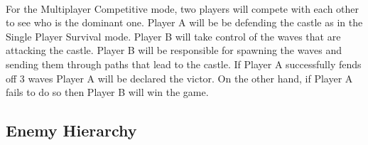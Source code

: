 \paragraph{} For the Multiplayer Competitive mode, two players will compete with each other to see who is the dominant one. Player A will be be defending the castle as in the Single Player Survival mode. Player B will take control of the waves that are attacking the castle. Player B will be responsible for spawning the waves and sending them through paths that lead to the castle. If Player A successfully fends off 3 waves Player A will be declared the victor. On the other hand, if Player A fails to do so then Player B will win the game.

\subsection{Enemy Hierarchy}

